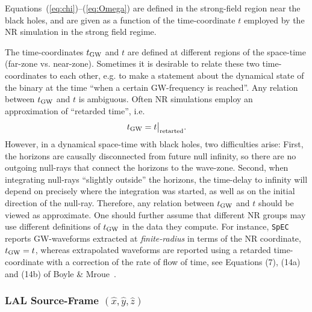 \documentclass[11pt,tightenlines,article,amssymb,amsmath,amsfonts,superscriptaddress]{revtex4}
\newcommand{\tGW}{t_{\rm GW}}
\newcommand{\ExS}{{{\hat x}}}
\newcommand{\EyS}{{{\hat y}}}
\newcommand{\EzS}{{{\hat z}}}
\begin{document}
Equations~(\ref{eq:chi})--(\ref{eq:Omega}) are defined in the
strong-field region near the black holes, and are given as a function
of the time-coordinate $t$ employed by the NR simulation in the strong
field regime.

The time-coordinates $\tGW$ and $t$ are defined at different regions
of the space-time (far-zone vs. near-zone).  Sometimes it is desirable
to relate these two time-coordinates to each other, e.g. to make a
statement about the dynamical state of the binary at the time ``when a
certain GW-frequency is reached''.  Any relation between $\tGW$ and
$t$ is ambiguous.  Often NR simulations employ an approximation of
``retarded time'', i.e.
\begin{equation}
  \label{eq:tretarted}
  \tGW = t\big|_{\rm retarted}.
\end{equation}
However, in a dynamical space-time with black holes, two difficulties
arise: First, the horizons are causally disconnected from future null
infinity, so there are no outgoing null-rays that connect the horizons
to the wave-zone.  Second, when integrating null-rays ``slightly
outside'' the horizons, the time-delay to infinity will depend on
precisely where the integration was started, as well as on the initial
direction of the null-ray.  Therefore, any relation between $\tGW$ and
$t$ should be viewed as approximate.  One should further assume that
different NR groups may use different definitions of $\tGW$ in the
data they compute.  For instance, {\tt SpEC} reports GW-waveforms
extracted at \emph{finite-radius} in terms of the NR coordinate,
$\tGW=t$, whereas extrapolated waveforms are reported using a retarded
time-coordinate with a correction of the rate of flow of time, see
Equations (7), (14a) and (14b) of Boyle \& Mroue~\cite{Boyle:2009vi}.


\subsubsection{LAL Source-Frame \boldmath$(\ExS, \EyS, \EzS)$}
\end{document}
